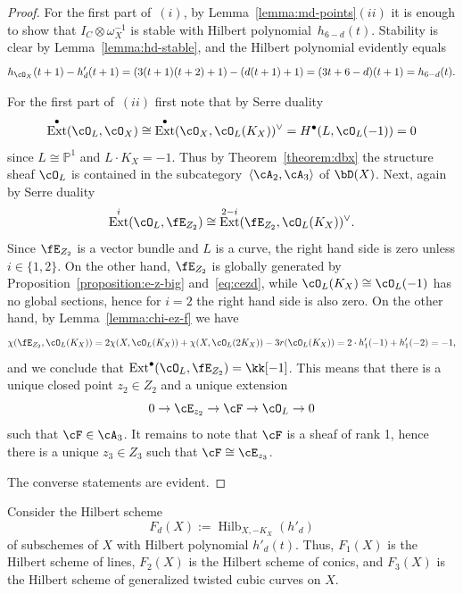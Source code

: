 \documentclass[11pt]{amsart}
\renewcommand{\P}{{\mathbb{P}}}
\DeclareMathOperator{\Ext}{\mathrm{Ext}}
\DeclareMathOperator{\Hilb}{\mathrm{Hilb}}
\theoremstyle{plain}
\theoremstyle{definition}
\theoremstyle{remark}
\begin{document}
\begin{proof}
For the first part of~$(i)$, by Lemma~\ref{lemma:md-points}$(ii)$ it is enough to show 
that $I_C \otimes \omega_X^{-1}$ is stable with Hilbert polynomial~$h_{6-d}(t)$.
Stability is clear by Lemma~\ref{lemma:hd-stable}, and the Hilbert polynomial evidently equals 
\begin{equation*}
h_{\cO_X}(t+1) - h'_d(t+1) = (3(t+1)(t+2) + 1) - (d(t+1) + 1) = (3t + 6 - d)(t + 1) = h_{6-d}(t).
\end{equation*}



For the first part of~$(ii)$ first note that by Serre duality 
\begin{equation*}
\Ext^\bullet(\cO_L,\cO_X) \cong \Ext^\bullet(\cO_X,\cO_L(K_X))^\vee = H^\bullet(L,\cO_L(-1)) = 0 
\end{equation*}
since $L \cong \P^1$ and $L \cdot K_X = -1$.
Thus by Theorem~\ref{theorem:dbx} the structure sheaf $\cO_L$ is contained in the subcategory~$\langle \cA_2, \cA_3 \rangle$ of $\bD(X)$.
Next, again by Serre duality
\begin{equation*}
\Ext^i(\cO_L,\fE_{Z_2}) \cong \Ext^{2-i}(\fE_{Z_2},\cO_L(K_X))^\vee.
\end{equation*}
Since $\fE_{Z_2}$ is a vector bundle and $L$ is a curve, the right hand side is zero unless $i \in \{1, 2\}$.
On the other hand, $\fE_{Z_2}$ is globally generated by Proposition~\ref{proposition:e-z-big} and~\eqref{eq:cezd}, while $\cO_L(K_X) \cong \cO_L(-1)$ has no global sections, hence for $i = 2$ the right hand side is also zero.
On the other hand, by Lemma~\ref{lemma:chi-ez-f} we have
\begin{equation*}
\chi(\fE_{Z_2},\cO_L(K_X)) = 2\chi(X,\cO_L(K_X)) + \chi(X,\cO_L(2K_X)) - 3r(\cO_L(K_X)) = 2 \cdot h'_1(-1) + h'_1(-2) = -1,
\end{equation*}
and we conclude that $\Ext^\bullet(\cO_L, \fE_{Z_2}) = \kk[-1]$.
This means that there is a unique closed point $z_2 \in Z_2$ and a unique extension
\begin{equation*}
0 \to \cE_{z_2} \to \cF \to \cO_L \to 0
\end{equation*}
such that $\cF \in \cA_3$. 
It remains to note that $\cF$ is a sheaf of rank 1, hence there is a unique $z_3 \in Z_3$ such that $\cF \cong \cE_{z_3}$.

The converse statements are evident.
\end{proof}


Consider the Hilbert scheme
\begin{equation}
\label{def:fd}
F_d(X) := \Hilb_{X,-K_X}(h'_d)
\end{equation} 
of subschemes of $X$ with Hilbert polynomial $h'_d(t)$.
Thus, $F_1(X)$ is the Hilbert scheme of lines, $F_2(X)$ is the Hilbert scheme of conics, and $F_3(X)$ is the Hilbert scheme of generalized twisted cubic curves on $X$.
\end{document}

